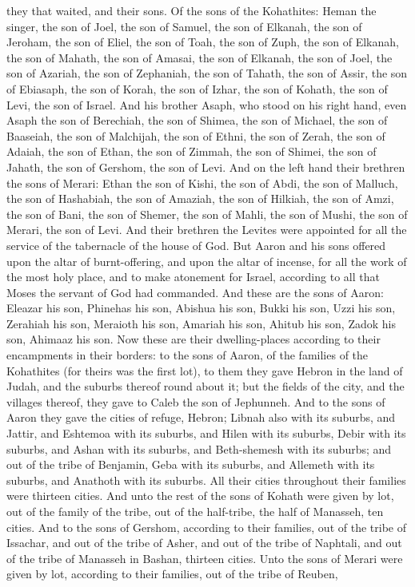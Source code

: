 they that waited, and their sons. Of the sons of the Kohathites: Heman the singer, the son of Joel, the son of Samuel, the son of Elkanah, the son of Jeroham, the son of Eliel, the son of Toah, the son of Zuph, the son of Elkanah, the son of Mahath, the son of Amasai, the son of Elkanah, the son of Joel, the son of Azariah, the son of Zephaniah, the son of Tahath, the son of Assir, the son of Ebiasaph, the son of Korah, the son of Izhar, the son of Kohath, the son of Levi, the son of Israel. And his brother Asaph, who stood on his right hand, even Asaph the son of Berechiah, the son of Shimea, the son of Michael, the son of Baaseiah, the son of Malchijah, the son of Ethni, the son of Zerah, the son of Adaiah, the son of Ethan, the son of Zimmah, the son of Shimei, the son of Jahath, the son of Gershom, the son of Levi. And on the left hand their brethren the sons of Merari: Ethan the son of Kishi, the son of Abdi, the son of Malluch, the son of Hashabiah, the son of Amaziah, the son of Hilkiah, the son of Amzi, the son of Bani, the son of Shemer, the son of Mahli, the son of Mushi, the son of Merari, the son of Levi. And their brethren the Levites were appointed for all the service of the tabernacle of the house of God.  But Aaron and his sons offered upon the altar of burnt-offering, and upon the altar of incense, for all the work of the most holy place, and to make atonement for Israel, according to all that Moses the servant of God had commanded. And these are the sons of Aaron: Eleazar his son, Phinehas his son, Abishua his son, Bukki his son, Uzzi his son, Zerahiah his son, Meraioth his son, Amariah his son, Ahitub his son, Zadok his son, Ahimaaz his son.  Now these are their dwelling-places according to their encampments in their borders: to the sons of Aaron, of the families of the Kohathites (for theirs was the first lot), to them they gave Hebron in the land of Judah, and the suburbs thereof round about it; but the fields of the city, and the villages thereof, they gave to Caleb the son of Jephunneh. And to the sons of Aaron they gave the cities of refuge, Hebron; Libnah also with its suburbs, and Jattir, and Eshtemoa with its suburbs, and Hilen with its suburbs, Debir with its suburbs, and Ashan with its suburbs, and Beth-shemesh with its suburbs; and out of the tribe of Benjamin, Geba with its suburbs, and Allemeth with its suburbs, and Anathoth with its suburbs. All their cities throughout their families were thirteen cities.  And unto the rest of the sons of Kohath were given by lot, out of the family of the tribe, out of the half-tribe, the half of Manasseh, ten cities. And to the sons of Gershom, according to their families, out of the tribe of Issachar, and out of the tribe of Asher, and out of the tribe of Naphtali, and out of the tribe of Manasseh in Bashan, thirteen cities. Unto the sons of Merari were given by lot, according to their families, out of the tribe of Reuben, 